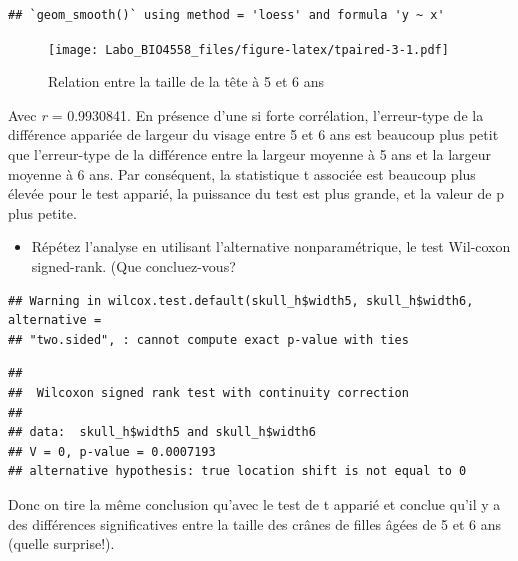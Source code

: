 \documentclass[12pt,]{book}
\newenvironment{Shaded}{\begin{snugshade}}{\end{snugshade}}
\newcommand{\DataTypeTok}[1]{\textcolor[rgb]{0.13,0.29,0.53}{#1}}
\newcommand{\KeywordTok}[1]{\textcolor[rgb]{0.13,0.29,0.53}{\textbf{#1}}}
\newcommand{\NormalTok}[1]{#1}
\newcommand{\OperatorTok}[1]{\textcolor[rgb]{0.81,0.36,0.00}{\textbf{#1}}}
\newcommand{\OtherTok}[1]{\textcolor[rgb]{0.56,0.35,0.01}{#1}}
\newcommand{\StringTok}[1]{\textcolor[rgb]{0.31,0.60,0.02}{#1}}
\providecommand{\tightlist}{%
  \setlength{\itemsep}{0pt}\setlength{\parskip}{0pt}}
\begin{document}
\begin{verbatim}
## `geom_smooth()` using method = 'loess' and formula 'y ~ x'
\end{verbatim}

\begin{figure}
\centering
\texttt{[image: Labo\_BIO4558\_files/figure-latex/tpaired-3-1.pdf]}
\caption{\label{fig:tpaired-3}Relation entre la taille de la tête à 5 et 6 ans}
\end{figure}

Avec \emph{r} = 0.9930841. En présence d'une si forte corrélation, l'erreur-type de la différence appariée de largeur du visage entre 5 et 6 ans est beaucoup plus petit que l'erreur-type de la différence entre la largeur moyenne à 5 ans et la largeur moyenne à 6 ans. Par conséquent, la statistique t associée est beaucoup plus élevée pour le test apparié, la puissance du test est plus grande, et la valeur de p plus petite.

\begin{itemize}
\tightlist
\item
  Répétez l'analyse en utilisant l'alternative nonparamétrique, le test Wil-coxon signed-rank. (Que concluez-vous?
\end{itemize}

\begin{Shaded}
\end{Shaded}

\begin{verbatim}
## Warning in wilcox.test.default(skull_h$width5, skull_h$width6, alternative =
## "two.sided", : cannot compute exact p-value with ties
\end{verbatim}

\begin{verbatim}
## 
##  Wilcoxon signed rank test with continuity correction
## 
## data:  skull_h$width5 and skull_h$width6
## V = 0, p-value = 0.0007193
## alternative hypothesis: true location shift is not equal to 0
\end{verbatim}

Donc on tire la même conclusion qu'avec le test de t apparié et conclue qu'il y a des différences significatives entre la taille des crânes de filles âgées de 5 et 6 ans (quelle surprise!).
\end{document}
